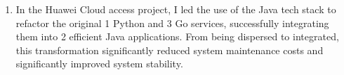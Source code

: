 \documentclass{resume}
\newcommand{\en}[1]{#1}
\newcommand{\zh}[1]{}
\begin{document}
\begin{itemize}
\begin{enumerate}
                  \item \en{In the Huawei Cloud access project, I led the use of the Java tech stack to refactor the original 1 Python and 3 Go services, successfully integrating them into 2 efficient Java applications. From being dispersed to integrated, this transformation significantly reduced system maintenance costs and significantly improved system stability.}
                        \zh{在华为云接入项目中，我主导使用Java技术栈对原有1个Python和3个Go服务的重构，成功整合为2个高效的Java应用。由分散到整合，这一改造显著降低了系统维护成本，并显著提升了系统稳定性。\\}
            \end{enumerate}
\end{itemize}
\en{}
\zh{\rolewithdate{资源管理平台}{后端开发实习生}{2022/12 -- 2023/06}}
\end{document}
